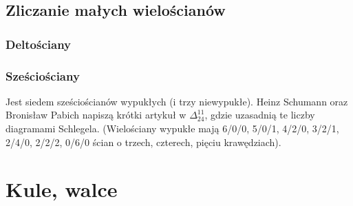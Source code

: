 \subsection{Zliczanie małych wielościanów}
\subsubsection{Deltościany}

\subsubsection{Sześciościany}
Jest siedem sześciościanów wypukłych (i trzy niewypukłe).
Heinz Schumann oraz Bronisław Pabich napiszą krótki artykuł w $\Delta_{24}^{11}$, gdzie uzasadnią te liczby diagramami Schlegela.
%
(Wielościany wypukłe mają 6/0/0, 5/0/1, 4/2/0, 3/2/1, 2/4/0, 2/2/2, 0/6/0 ścian o trzech, czterech, pięciu krawędziach).

\section{Kule, walce}
